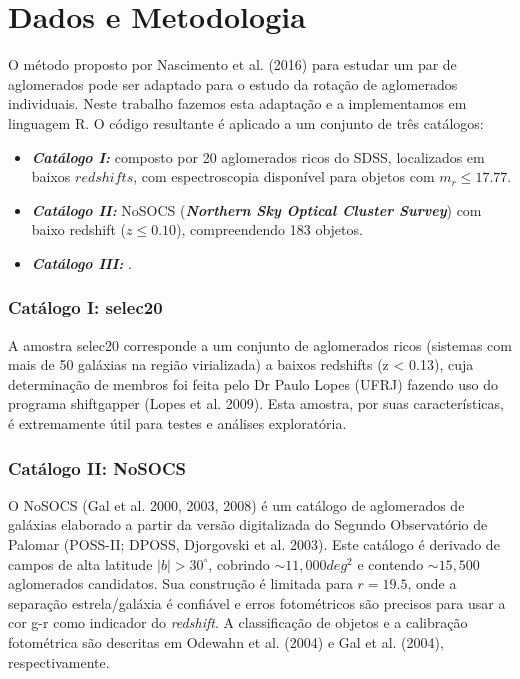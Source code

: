 \chapter{Dados e Metodologia}

O método proposto por Nascimento et al. (2016) para estudar um par de aglomerados pode ser adaptado para o estudo da rotação de aglomerados individuais. Neste trabalho fazemos esta adaptação e a implementamos em linguagem R. O código resultante é aplicado a um conjunto de três catálogos: 

\begin{itemize}
   \item \textit{\textbf{Catálogo I: }} composto por 20 aglomerados ricos do SDSS, localizados em baixos $redshifts$, com espectroscopia disponível para objetos com $m_r \leq 17.77$.
   \item \textit{\textbf{Catálogo II: }} NoSOCS (\textit{\textbf{Northern Sky Optical Cluster Survey}}) com baixo redshift ($z \leq 0.10$), compreendendo 183 objetos.	
   \item \textit{\textbf{Catálogo III: }} .
 \end{itemize}  

\subsection{Catálogo I: selec20}
A amostra selec20  corresponde a um conjunto de aglomerados ricos (sistemas com mais de 50 galáxias na região virializada) a baixos redshifts (z < 0.13), cuja determinação de membros foi feita pelo Dr Paulo Lopes (UFRJ) fazendo uso do programa shiftgapper (Lopes et al. 2009). Esta amostra, por suas características, é  extremamente útil para testes e análises exploratória. 


\subsection{Catálogo II: NoSOCS}

O NoSOCS (Gal et al. 2000, 2003, 2008) é um catálogo de aglomerados de galáxias elaborado a partir da versão digitalizada do Segundo Observatório de Palomar (POSS-II; DPOSS, Djorgovski et al. 2003). Este catálogo é derivado de campos de alta latitude $\vert b \vert > 30^\circ$, cobrindo $ \sim 11,000  deg^2$ e contendo $\sim 15,500$ aglomerados candidatos. Sua construção é limitada para $r = 19.5$, onde a separação estrela/galáxia é confiável e erros fotométricos são precisos para usar a cor g-r como indicador do \textit{redshift}. A classificação de objetos e a calibração fotométrica são descritas em Odewahn et al. (2004) e Gal et al. (2004), respectivamente.

